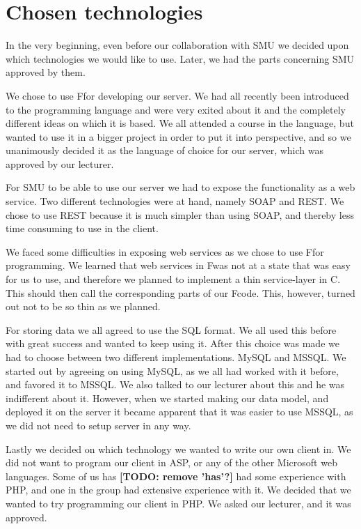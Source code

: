 \section{Chosen technologies}
In the very beginning, even before our collaboration with SMU we decided upon which technologies we would like to use. Later, we had the parts concerning SMU approved by them.

We chose to use F\Sh for developing our server. We had all recently been introduced to the programming language and were very exited about it and the completely different ideas on which it is based. We all attended a course in the language, but wanted to use it in a bigger project in order to put it into perspective, and so we unanimously decided it as the language of choice for our server, which was approved by our lecturer.

For SMU to be able to use our server we had to expose the functionality as a web service. Two different technologies were at hand, namely SOAP and REST. We chose to use REST because it is much simpler than using SOAP, and thereby less time consuming to use in the client.

We faced some difficulties in exposing web services as we chose to use F\Sh for programming. We learned that web services in F\Sh was not at a state that was easy for us to use, and therefore we planned to implement a thin service-layer in C\Sh. This should then call the corresponding parts of our F\Sh code. This, however, turned out not to be so thin as we planned.

For storing data we all agreed to use the SQL format. We all used this before with great success and wanted to keep using it. After this choice was made we had to choose between two different implementations. MySQL and MSSQL. We started out by agreeing on using MySQL, as we all had worked with it before, and favored it to MSSQL. We also talked to our lecturer about this and he was indifferent about it. However, when we started making our data model, and deployed it on the server it became apparent that it was easier to use MSSQL, as we did not need to setup server in any way.

Lastly we decided on which technology we wanted to write our own client in. We did not want to program our client in ASP, or any of the other Microsoft web languages. Some of us has \textbf{[TODO: remove 'has'?]} had some experience with PHP, and one in the group had extensive experience with it. We decided that we wanted to try programming our client in PHP. We asked our lecturer, and it was approved.
\newpage